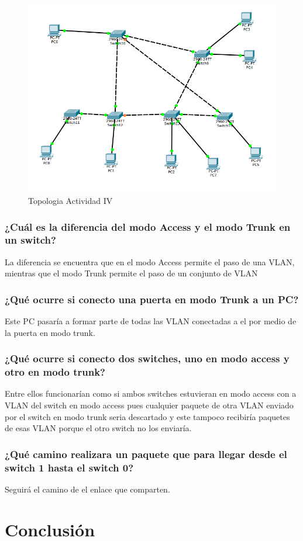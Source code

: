 ﻿\documentclass[spanish]{udpreport}
\begin{document}
\begin{figure}[H]
	\caption{Topologia Actividad IV}
	\label{fig:Figura 2.4}
	\centering
	\includegraphics[scale=.6, bb=0 0 0 0]{imagenes/A4e.png}
	\linebreak
\end{figure}

\subsection{¿Cuál es la diferencia del modo Access y el modo Trunk en un switch?}
La diferencia se encuentra que en el modo Access permite el paso de una VLAN, mientras que el modo Trunk permite el paso de un conjunto de VLAN

\subsection{¿Qué ocurre si conecto una puerta en modo Trunk a un PC?}
Este PC pasaría a formar parte de todas las VLAN conectadas a el por medio de la puerta en modo trunk.

\subsection{¿Qué ocurre si conecto dos switches, uno en modo access y otro en modo trunk?}
Entre ellos funcionarían como si ambos switches estuvieran en modo access con a VLAN del switch en modo access pues cualquier paquete de otra VLAN enviado por el switch en modo trunk seria descartado y este tampoco recibiría paquetes de esas VLAN porque el otro switch no los enviaría.

\subsection{¿Qué camino realizara un paquete que para llegar desde el switch 1 hasta el switch 0?}

Seguirá el camino de el enlace que comparten.

\chapter{Conclusión}
\listoffigures
\end{document}
